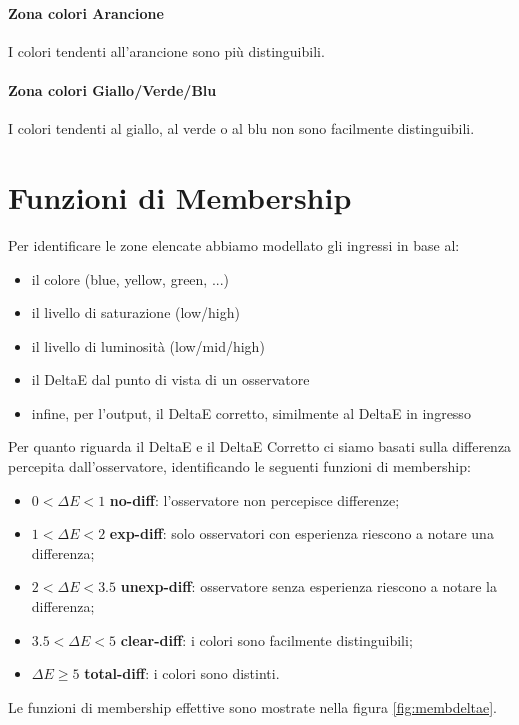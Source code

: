\paragraph{Zona colori Arancione} I colori tendenti all'arancione sono più distinguibili.
\paragraph{Zona colori Giallo/Verde/Blu} I colori tendenti al giallo, al verde o al blu non sono facilmente distinguibili.

\section{Funzioni di Membership}
Per identificare le zone elencate abbiamo modellato gli ingressi in base al:
\begin{itemize}
	\item il colore (blue, yellow, green, ...)
	\item il livello di saturazione (low/high)
	\item il livello di luminosità (low/mid/high)
	\item il DeltaE dal punto di vista di un osservatore
	\item infine, per l'output, il DeltaE corretto, similmente al DeltaE in ingresso
\end{itemize}
Per quanto riguarda il DeltaE e il DeltaE Corretto ci siamo basati sulla differenza percepita dall'osservatore, identificando le seguenti funzioni di membership:

\begin{itemize}
	\item \( 0 < \Delta E < 1\) \textbf{no-diff}: l'osservatore non percepisce differenze;
	\item \( 1 < \Delta E < 2\) \textbf{exp-diff}: solo osservatori con esperienza riescono a notare una differenza;
	\item \( 2 < \Delta E < 3.5\) \textbf{unexp-diff}: osservatore senza esperienza riescono a notare la differenza;
	\item \( 3.5 < \Delta E < 5\) \textbf{clear-diff}: i colori sono facilmente distinguibili;
	\item \( \Delta E \geq 5\) \textbf{total-diff}: i colori sono distinti.
\end{itemize}
Le funzioni di membership effettive sono mostrate nella figura \ref{fig:membdeltae}.

